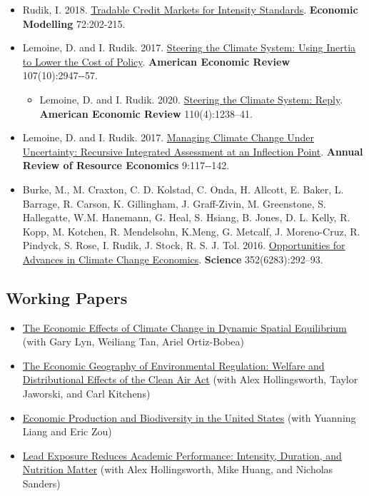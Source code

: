 \documentclass[12pt]{res} %
\begin{document}
\begin{resume}
\begin{itemize}
	\item[] Rudik, I. 2018. \href{https://www.sciencedirect.com/science/article/pii/S0264999317315651}{Tradable Credit Markets for Intensity Standards}. \textbf{Economic Modelling} 72:202-215.
	\item[] Lemoine, D. and I. Rudik. 2017.  \href{http://papers.ssrn.com/sol3/papers.cfm?abstract_id=2443594}{Steering the Climate System: Using Inertia to Lower the Cost of Policy}. \textbf{American Economic Review} 107(10):2947‐-57.
	\begin{itemize}
		\item[] Lemoine, D. and I. Rudik. 2020.  \href{http://papers.ssrn.com/sol3/papers.cfm?abstract_id=2443594}{Steering the Climate System: Reply}. \textbf{American Economic Review} 110(4):1238--41.
	\end{itemize}
	\item[] Lemoine, D. and I. Rudik. 2017. \href{https://papers.ssrn.com/sol3/papers.cfm?abstract_id=2862211}{Managing Climate Change Under Uncertainty: Recursive Integrated Assessment at an Inflection Point}.  \textbf{Annual Review of Resource Economics} 9:117‐-142.
	\item[]  Burke, M., M. Craxton, C. D. Kolstad, C. Onda, H. Allcott, E. Baker, L. Barrage, R. Carson, K. Gillingham, J. Graff-Zivin, M. Greenstone, S. Hallegatte, W.M. Hanemann, G. Heal, S. Hsiang, B. Jones, D. L. Kelly, R. Kopp, M. Kotchen, R. Mendelsohn, K.Meng, G. Metcalf, J. Moreno-Cruz, R. Pindyck, S. Rose, I. Rudik, J. Stock, R. S. J. Tol. 2016. \href{http://science.sciencemag.org/content/352/6283/292.abstract}{Opportunities for Advances in Climate Change Economics}. \textbf{Science} 352(6283):292--93.
\end{itemize} 


\vspace{-.2in}


\subsection{Working Papers}

\begin{itemize} %
	\item[] \href{https://osf.io/preprints/socarxiv/usghb}{The Economic Effects of Climate Change in Dynamic Spatial Equilibrium} (with Gary Lyn, Weiliang Tan, Ariel Ortiz-Bobea)
	\item[]\href{https://ivanrudik.com}{The Economic Geography of Environmental Regulation: Welfare and Distributional Effects of the Clean Air Act} (with Alex Hollingsworth, Taylor Jaworski, and Carl Kitchens)
	\item[] \href{https://osf.io/preprints/socarxiv/qy76a}{Economic Production and Biodiversity in the United States} (with Yuanning Liang and Eric Zou)
	\item[] \href{https://www.nber.org/papers/w28250}{Lead Exposure Reduces Academic Performance: Intensity, Duration, and Nutrition Matter} (with Alex Hollingsworth, Mike Huang, and Nicholas Sanders)
\end{itemize}


\end{resume}
\end{document}
